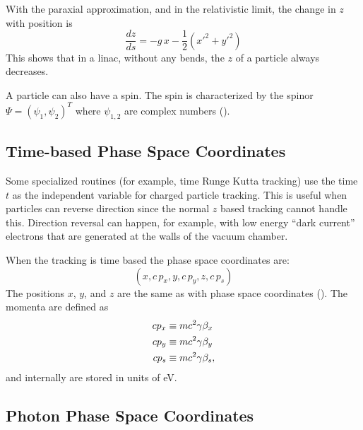 With the paraxial approximation, and in the relativistic limit, the change in $z$ with position is
\begin{equation}
  \frac{dz}{ds} = -g \, x - \frac{1}{2} (x'^2 + y'^2)
\end{equation}
This shows that in a linac, without any bends, the $z$ of a particle always decreases.

A particle can also have a spin. The spin is characterized by the spinor $\Psi = \left( \psi_{1},
\psi_{2} \right)^{T}$ where $\psi_{1,2}$ are complex numbers ().

\subsection{Time-based Phase Space Coordinates}
\label{s:time.phase.space}

Some specialized routines (for example, time Runge Kutta tracking) use the time $t$ as the
independent variable for charged particle tracking. This is useful when particles can reverse
direction since the normal $z$ based tracking cannot handle this. Direction reversal can happen, for
example, with low energy ``dark current'' electrons that are generated at the walls of the vacuum
chamber.

When the tracking is time based the phase space coordinates are:
\begin{equation}
  (x, c \, p_x, y, c \, p_y, z, c \, p_s)
\end{equation}
The positions $x$, $y$, and $z$ are the same as with phase space coordinates
(). The momenta are defined as
\begin{align}
c p_x &\equiv m c^2 \gamma \beta_x \nonumber \\
c p_y &\equiv m c^2 \gamma \beta_y \\
c p_s &\equiv m c^2 \gamma \beta_s, \nonumber
\end{align}
and internally are stored in units of eV.

\subsection{Photon Phase Space Coordinates}
\label{s:photon.phase.space}

